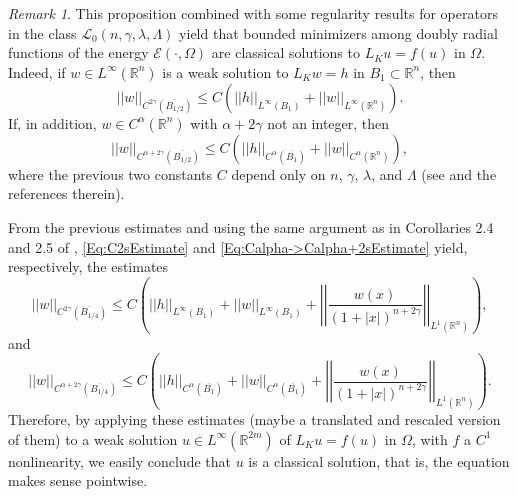 \documentclass[12pt,reqno]{amsart}
\theoremstyle{definition}
\theoremstyle{remark}
\newtheorem{remark}[theorem]{Remark}
\newcommand{\con}[1]{\mathbb{#1}}
\newcommand{\R}{\con{R}} %
\newcommand{\ecal}{\mathcal{E}}
\newcommand{\lcal}{\mathcal{L}}
\newcommand{\norm}[1]{\left | \left |{#1} \right | \right |}
\newcommand{\s}{\gamma}
\newcommand{\bpar}[1]{\left ( {#1}\right )}
\numberwithin{equation}{section}
\begin{document}
\begin{remark}
	\label{Remark:InteriorRegularity}
	This proposition combined with some regularity results for operators in the class $\lcal_0(n,\s,\lambda, \Lambda)$ yield that bounded minimizers among doubly radial functions of the energy $\ecal(\cdot,\Omega)$ are classical solutions to $L_K u = f(u)$ in $\Omega$. Indeed, if $w\in L^\infty (\R^n)$ is a weak solution to $L_K w = h$ in $B_1\subset \R^n$, then
	\begin{equation}
	\label{Eq:C2sEstimate}
	\norm{w}_{C^{2\s} (\overline{B_{1/2}})} \leq C\bpar{\norm{h}_{L^\infty (B_1)} + \norm{w}_{L^\infty  (\R^n)}}.
	\end{equation} 
	If, in addition, $w \in C^\alpha (\R^n)$ with $\alpha + 2\s$ not an integer, then
	\begin{equation}
	\label{Eq:Calpha->Calpha+2sEstimate}
	\norm{w}_{C^{\alpha + 2\s} (\overline{B_{1/2}})} \leq C\bpar{\norm{h}_{C^{\alpha} (\overline{B_1})} + \norm{w}_{C^\alpha (\R^n)} },
	\end{equation}
	where the previous two constants $C$ depend only on $n$, $\s$, $\lambda$, and $\Lambda$ (see \cite{RosOton-Survey,SerraC2s+alphaRegularity} and the references therein).
	
	From the previous estimates and using the same argument as in Corollaries 2.4 and 2.5 of \cite{RosOtonSerra-Regularity}, \eqref{Eq:C2sEstimate} and \eqref{Eq:Calpha->Calpha+2sEstimate} yield, respectively, the estimates
	\begin{equation}
	\label{Eq:C2sEstimateBalls}
	\norm{w}_{C^{2\s} (\overline{B_{1/4}})} \leq C\bpar{\norm{h}_{L^\infty (B_1)} + \norm{w}_{L^\infty  (B_1)} + \norm{\dfrac{w(x)}{(1+|x|)^{n+2\s}}}_{L^1(\R^n)} },
	\end{equation}
	and 
	\begin{equation}
	\label{Eq:Calpha->Calpha+2sEstimateBalls}
	\norm{w}_{C^{\alpha + 2\s} (\overline{B_{1/4}})} \leq C\bpar{\norm{h}_{C^{\alpha} (\overline{B_1})} + \norm{w}_{C^\alpha (\overline{B_1})} + \norm{\dfrac{w(x)}{(1+|x|)^{n+2\s}}}_{L^1(\R^n)} }.
	\end{equation}
	Therefore, by applying these estimates (maybe a translated and rescaled version of them) to a weak solution $u\in L^\infty(\R^{2m})$ of $L_K u = f(u)$ in $\Omega$, with $f$ a $C^1$ nonlinearity, we easily conclude that $u$ is a classical solution, that is, the equation makes sense pointwise.
\end{remark}


\end{document}
